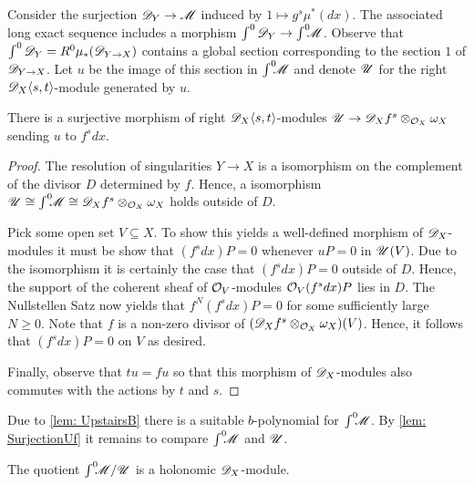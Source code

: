 Consider the surjection $\mathscr{D}_Y\to \mathscr{M}$ induced by $1 \mapsto g^s \mu^*(dx)$.
The associated long exact sequence includes a morphism $\int^0\mathscr{D}_Y \to \int^0 \mkern -8mu\mathscr{M}$.
Observe that $\int^0\mathscr{D}_Y = R^0 \mu_*(\mathscr{D}_{Y\to X})$ contains a global section corresponding to the section $1$ of $\mathscr{D}_{Y\to X}$.
Let $u$ be the image of this section in $\int^0 \mkern -8mu\mathscr{M}$ and denote $\mathscr{U}$ for the right $\mathscr{D}_X\langle s,t\rangle$-module generated by $u$.
\begin{lemma}\label{lem: SurjectiveUf}
  There is a surjective morphism of right $\mathscr{D}_X\langle s,t\rangle$-modules $\mathscr{U} \to \mathscr{D}_X f^s \otimes_{\mathcal{O}_X} \omega_X$ sending $u$ to $f^s dx$.
\end{lemma}
\begin{proof}
  The resolution of singularities $Y\to X$ is a isomorphism on the complement of the divisor $D$ determined by $f$.
  Hence, a isomorphism $\mathscr{U} \cong \int^0 \mkern -8mu \mathscr{M} \cong  \mathscr{D}_X f^s  \otimes_{\mathcal{O}_X}\omega_X$ holds outside of $D$.

  Pick some open set $V\subseteq X$. To show this yields a well-defined morphism of $\mathscr{D}_X$-modules it must be show that $(f^s dx)P = 0$ whenever $uP = 0$ in $\mathscr{U}(V)$.
  Due to the isomorphism it is certainly the case that $(f^s dx) P = 0$ outside of $D$.
  Hence, the support of the coherent sheaf of $\mathcal{O}_V$-modules $\mathcal{O}_V (f^s dx) P $ lies in $D$.
  The Nullstellen Satz now yields that $f^N (f^s dx) P  = 0$ for some sufficiently large $N\geq 0$.
  Note that $f$ is a non-zero divisor of $(\mathscr{D}_Xf^s\otimes_{\mathcal{O}_X} \omega_X)(V)$.
  Hence, it follows that $(f^s dx) P= 0$ on $V$ as desired.

  Finally, observe that $tu = fu$ so that this morphism of $\mathscr{D}_X$-modules also commutes with the actions by $t$ and $s$.
\end{proof}
Due to \cref{lem: UpstairsB} there is a suitable $b$-polynomial for $\int^0 \mkern -8mu \mathscr{M}$.
By \cref{lem: SurjectionUf} it remains to compare $\int^0 \mkern -8mu\mathscr{M}$ and $\mathscr{U}$.
\begin{lemma}\label{lem: QuotientHolonomic}
  The quotient $\int^0 \mkern -8mu\mathscr{M} / \mathscr{U}$ is a holonomic $\mathscr{D}_X$-module.
\end{lemma}
